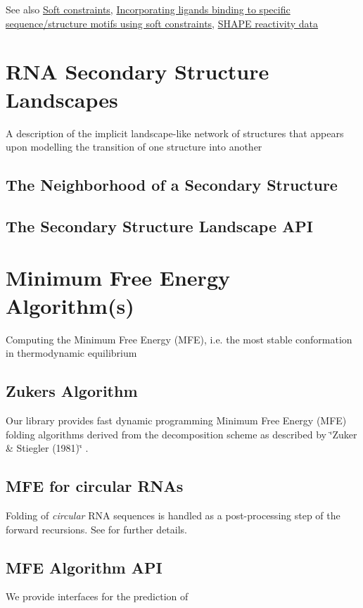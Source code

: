 \begin{DoxySeeAlso}{See also}
\hyperlink{group__soft__constraints}{Soft constraints}, \hyperlink{group__constraints__ligand}{Incorporating ligands binding to specific sequence/structure motifs using soft constraints}, \hyperlink{group__SHAPE__reactivities}{S\+H\+A\+PE reactivity data}
\end{DoxySeeAlso}
 \hypertarget{secondary_structure_landscape}{}\section{R\+NA Secondary Structure Landscapes}\label{secondary_structure_landscape}
A description of the implicit landscape-\/like network of structures that appears upon modelling the transition of one structure into another\hypertarget{secondary_structure_landscape_landscape_neighborhood}{}\subsection{The Neighborhood of a Secondary Structure}\label{secondary_structure_landscape_landscape_neighborhood}
\hypertarget{secondary_structure_landscape_landscape_api}{}\subsection{The Secondary Structure Landscape A\+PI}\label{secondary_structure_landscape_landscape_api}
 \hypertarget{mfe_algorithm}{}\section{Minimum Free Energy Algorithm(s)}\label{mfe_algorithm}
Computing the Minimum Free Energy (M\+FE), i.\+e. the most stable conformation in thermodynamic equilibrium\hypertarget{mfe_algorithm_zuker_algorithm}{}\subsection{Zuker\textquotesingle{}s Algorithm}\label{mfe_algorithm_zuker_algorithm}
Our library provides fast dynamic programming Minimum Free Energy (M\+FE) folding algorithms derived from the decomposition scheme as described by \char`\"{}\+Zuker \& Stiegler (1981)\char`\"{} \cite{zuker:1981}.\hypertarget{mfe_algorithm_circular_folding}{}\subsection{M\+F\+E for circular R\+N\+As}\label{mfe_algorithm_circular_folding}
Folding of {\itshape circular} R\+NA sequences is handled as a post-\/processing step of the forward recursions. See \cite{hofacker:2006} for further details.\hypertarget{mfe_algorithm_mfe_algorithm_api}{}\subsection{M\+F\+E Algorithm A\+PI}\label{mfe_algorithm_mfe_algorithm_api}
We provide interfaces for the prediction of


